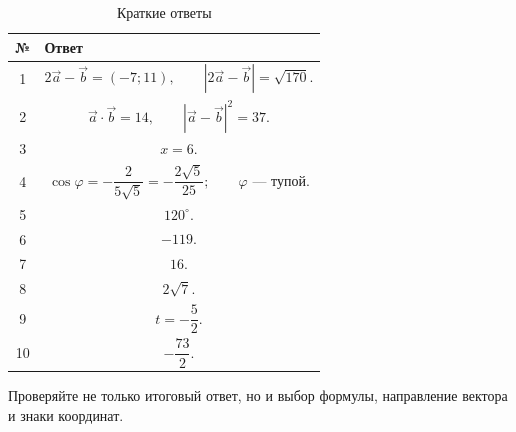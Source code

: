 \documentclass[a4paper,12pt]{article}
\newcommand{\vct}[1]{\vec{#1}}
\begin{document}
\begin{table}[h]
\centering
\caption{Краткие ответы}
\begin{tabularx}{\linewidth}{@{}cX@{}}
\toprule
\textbf{№} & \textbf{Ответ} \\
\midrule

1 &
\[
2\vct a-\vct b=(-7;11),
\qquad
|2\vct a-\vct b|=\sqrt{170}.
\]
\\

2 &
\[
\vct a\cdot\vct b=14,
\qquad
|\vct a-\vct b|^2=37.
\]
\\

3 &
\[
x=6.
\]
\\

4 &
\[
\cos\varphi=-\frac{2}{5\sqrt5}
=
-\frac{2\sqrt5}{25};
\qquad
\varphi\text{ --- тупой}.
\]
\\

5 &
\[
120^\circ.
\]
\\

6 &
\[
-119.
\]
\\

7 &
\[
16.
\]
\\

8 &
\[
2\sqrt7.
\]
\\

9 &
\[
t=-\frac52.
\]
\\

10 &
\[
-\frac{73}{2}.
\]
\\

\bottomrule
\end{tabularx}
\end{table}

\vfill

\begin{center}
{\small\color{textgray}
Проверяйте не только итоговый ответ, но и выбор формулы,
направление вектора и знаки координат.}
\end{center}
\end{document}

